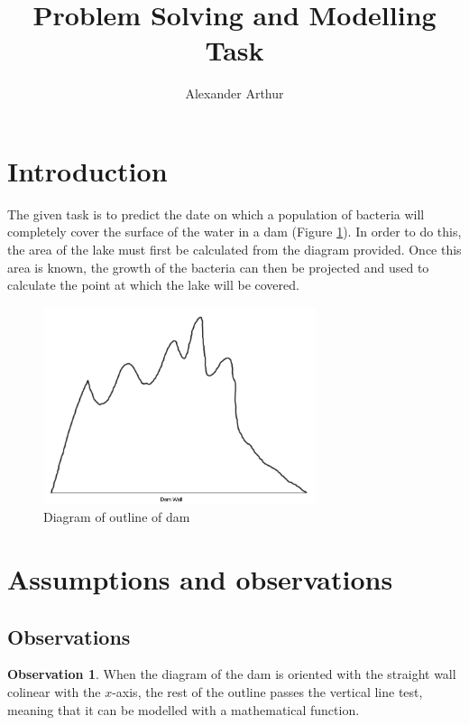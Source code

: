 \documentclass[a4paper]{article}
\title{Problem Solving and Modelling Task}
\author{Alexander Arthur}
\theoremstyle{definition}
\newtheorem{observation}{Observation}
\begin{document}
\maketitle
\setcounter{tocdepth}{1}
\tableofcontents


\section{Introduction}
    The given task is to predict the date on which a population of bacteria will completely cover the surface of the water in a dam (Figure \ref{figDamOutline}). In order to do this, the area of the lake must first be calculated from the diagram provided. Once this area is known, the growth of the bacteria can then be projected and used to calculate the point at which the lake will be covered.

    \begin{figure} %
        \centering
        \includegraphics[width = 8cm]{damDiagram.png}
        \caption{Diagram of outline of dam}
        \label{figDamOutline}
    \end{figure}



\section{Assumptions and observations}

    \subsection{Observations}

        \begin{observation}
            When the diagram of the dam is oriented with the straight wall colinear with the $x$-axis, the rest of the outline passes the vertical line test, meaning that it can be modelled with a mathematical function.
        \end{observation}
\end{document}
